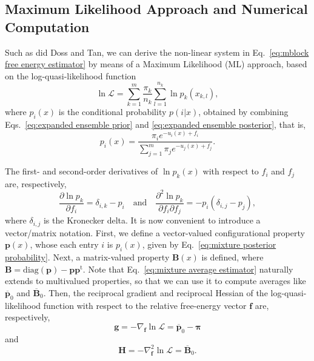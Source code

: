 \documentclass[aip,jcp,reprint,amsmath,amssymb]{revtex4-1}
\newcommand{\mt}[1]{\boldsymbol{\mathbf{#1}}}           %
\newcommand{\vt}[1]{\boldsymbol{\mathbf{#1}}}           %
\newcommand{\tr}[1]{#1^\text{t}}                        %
\begin{document}
\subsection{Maximum Likelihood Approach and Numerical Computation}

Such as did Doss and Tan,\cite{Doss_2014} we can derive the non-linear system in Eq.~\eqref{eq:mblock free energy estimator} by means of a Maximum Likelihood (ML) approach, based on the log-quasi-likelihood function\cite{Doss_2014, Tan_2015, Roy_2018}
\begin{equation}
\label{eq:mblock log-quasi-likelihood}
\ln \mathcal L = \sum_{k=1}^m \frac{\pi_k}{n_k} \sum_{l=1}^{n_k} \ln p_k(x_{k,l}),
\end{equation}
where $p_i(x)$ is the conditional probability $p(i|x)$, obtained by combining Eqs.~\eqref{eq:expanded ensemble prior} and \eqref{eq:expanded ensemble posterior}, that is,
\begin{equation}
\label{eq:mixture posterior probability}
p_i(x) = \frac{\pi_i e^{-u_i(x) + f_i}}{\sum_{j=1}^m \pi_j e^{-u_j(x) + f_j}}.
\end{equation}

The first- and second-order derivatives of $\ln p_k(x)$ with respect to $f_i$ and $f_j$ are, respectively,
\begin{equation*}
\frac{\partial \ln p_k}{\partial f_i} = \delta_{i,k} - p_i \quad \text{and} \quad \frac{\partial^2\ln p_k}{\partial f_i \partial f_j} = -p_i(\delta_{i,j} - p_j),
\end{equation*}
where $\delta_{i,j}$ is the Kronecker delta. It is now convenient to introduce a vector/matrix notation. First, we define a vector-valued configurational property $\vt p(x)$, whose each entry $i$ is $p_i(x)$, given by Eq.~\eqref{eq:mixture posterior probability}. Next, a matrix-valued property $\mt B(x)$ is defined, where $\mt B = \text{diag}(\vt p) - {\vt p}\tr{\vt p}$. Note that Eq.~\eqref{eq:mixture average estimator} naturally extends to multivalued properties, so that we can use it to compute averages like $\overline{\vt p}_0$ and $\overline{\mt B}_0$. Then, the reciprocal gradient and reciprocal Hessian of the log-quasi-likelihood function with respect to the relative free-energy vector $\vt f$ are, respectively,
\begin{equation}
\vt g = -\nabla_{\vt f} \ln \mathcal L = \overline{\vt p}_0 - \vt \pi
\end{equation}
and
\begin{equation}
\mt H = -\nabla^2_{\vt f} \ln \mathcal L = \overline{\mt B}_0.
\end{equation}
\end{document}
